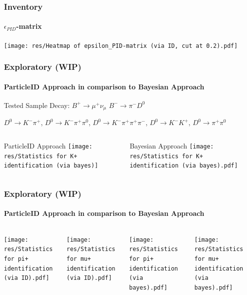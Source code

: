 \documentclass{beamer}
\begin{document}
\begin{frame}
	\frametitle{Inventory}
	\framesubtitle{$\epsilon_{PID}$-matrix}

	\centering
	\texttt{[image: res/Heatmap of epsilon\_PID-matrix (via ID, cut at 0.2).pdf]}
\end{frame}

\begin{frame}
	\frametitle{Exploratory (WIP)}
	\framesubtitle{ParticleID Approach in comparison to Bayesian Approach}

	Tested Sample Decay: \hspace{2em}
	$B^+ \rightarrow \mu^+ \nu_{\mu}$
	\hspace{2em}
	$B^- \rightarrow \pi^- D^0$
	\\
	\begin{addmargin}[1em]{0em}
		$D^0 \rightarrow K^- \pi^+$,
		$D^0 \rightarrow K^- \pi^+ \pi^0$,
		$D^0 \rightarrow K^- \pi^+ \pi^+ \pi^-$,
		$D^0 \rightarrow K^- K^+$,
		$D^0 \rightarrow \pi^+ \pi^0$
	\end{addmargin}

	\vspace{1em}

	\begin{columns}[T]
		\begin{column}{.5\textwidth}
			\centering ParticleID Approach
			\texttt{[image: res/Statistics for K+ identification (via bayes)]}
		\end{column}
		\begin{column}{.5\textwidth}
			\centering Bayesian Approach
			\texttt{[image: res/Statistics for K+ identification (via bayes).pdf]}
		\end{column}
	\end{columns}
\end{frame}

\begin{frame}
	\frametitle{Exploratory (WIP)}
	\framesubtitle{ParticleID Approach in comparison to Bayesian Approach}

	\begin{columns}
		\begin{minipage}[c][0.4\textheight][c]{\linewidth}
			\centering
			\texttt{[image: res/Statistics for pi+ identification (via ID).pdf]}
		\end{minipage}
		\begin{minipage}[c][0.4\textheight][c]{\linewidth}
			\centering
			\texttt{[image: res/Statistics for mu+ identification (via ID).pdf]}
		\end{minipage}

		\begin{minipage}[c][0.4\textheight][c]{\linewidth}
			\centering
			\texttt{[image: res/Statistics for pi+ identification (via bayes).pdf]}
		\end{minipage}
		\begin{minipage}[c][0.4\textheight][c]{\linewidth}
			\centering
			\texttt{[image: res/Statistics for mu+ identification (via bayes).pdf]}
		\end{minipage}
	\end{columns}
\end{frame}
\end{document}
